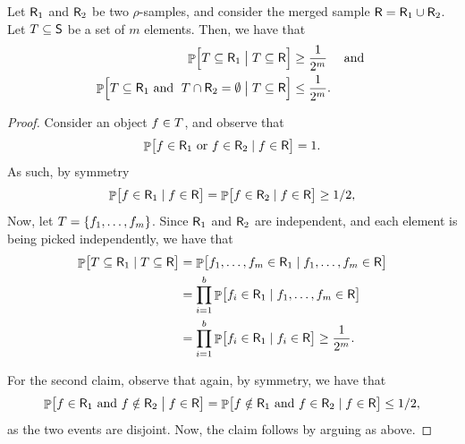 \begin{lemma}
    Let $\mathsf{R}_1$ and $\mathsf{R}_2$ be two $\rho$-samples, and
    consider the merged sample $\mathsf{R} = \mathsf{R}_1 \cup
    \mathsf{R}_2$. Let $T \subseteq \mathsf{S}$ be a set of $m$
    elements. Then, we have that
    \begin{align*}
      \Prob{ \Bigl. \SetB \subseteq \Sample_1 \bigm\vert{ \SetB \subseteq
      \Sample}} &\geq \frac{1}{2^m}
      \quad \text{ and }
      \\
      \Prob{ \Bigl. \SetB \subseteq \Sample_1%
      \text{ and }\;
      \SetB \cap \Sample_2 = \emptyset \bigm\vert{ \SetB \subseteq \Sample}}
      &\leq \frac{1}{2^m}.
    \end{align*}
\end{lemma}
\begin{proof}
    Consider an object $f \in T$, and observe that
    \[
        \Prob{\bigl. \obj \in \Sample_1
           \text{ or }  \obj \in \Sample_2
           \mid \obj \in \Sample} = 1.%
    \]
    As such, 
    by symmetry
    \begin{align*}
      \Prob{\bigl. \obj \in \Sample_1 \mid \obj \in \Sample}%
      =%
      \Prob{\bigl. \obj \in \Sample_2 \mid \obj \in \Sample}%
      \geq%
      1/2,
    \end{align*}    
    Now, let $T = \left\{ { f_1, \ldots, f_m} \right\}$. Since
    $\mathsf{R}_1$ and $\mathsf{R}_2$ are independent, and each element is
    being picked independently, we have that
    \begin{align*}
        \Prob{ \bigl. \SetB \subseteq \Sample_1 \mid{ \SetB \subseteq
        \Sample}}%
      &=%
        \Prob{ \bigl. \obj_1, \ldots, \obj_m  \in \Sample_1 \mid{
        \obj_1, \ldots, \obj_m \in \Sample}}
      \\&%
        =%
        \prod_{i=1}^b \Prob{ \bigl. \obj_i  \in \Sample_1 \mid{
        \obj_1, \ldots, \obj_m \in \Sample}}
      \\&%
          =%
          \prod_{i=1}^b \Prob{ \bigl. \obj_i  \in \Sample_1 \mid{
          \obj_i \in \Sample}}
          \geq%
          \frac{1}{2^m}.
    \end{align*}

    For the second claim, observe that again, by
    symmetry, we have that 
    \begin{equation*}
        \ProbCond{\bigl. \obj \in \Sample_1
           \text{ and }
           \obj \notin \Sample_2
        }{ \obj \in \Sample}%
        =%
      \Prob{\bigl. \obj \notin \Sample_1
      \text{ and } \obj \in \Sample_2
      \mid \obj \in \Sample}%
      \leq%
      1/2,
  \end{equation*}
    as the two events are disjoint. Now, the claim follows by arguing
    as above.
\end{proof}


